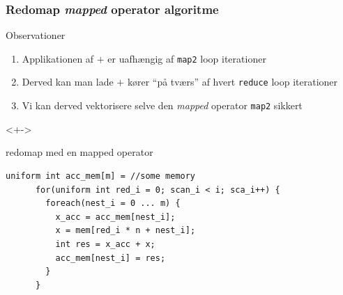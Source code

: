 \documentclass[t]{beamer}
\begin{document}
\begin{frame}[fragile]
  \frametitle{Redomap \textit{mapped} operator algoritme}
  Observationer
  \begin{enumerate}
    \item<+-> Applikationen af $+$ er uafhængig af \texttt{map2} loop iterationer
    \item<+-> Derved kan man lade $+$ kører ``på tværs'' af hvert \texttt{reduce} loop iterationer
    \item<+-> Vi kan derved vektorisere selve den \textit{mapped} operator \texttt{map2} sikkert
  \end{enumerate}
  \begin{onlyenv}<+->
    \begin{block}{redomap med en mapped operator}
\begin{lstlisting}[language=ispc]
      uniform int acc_mem[m] = //some memory
      for(uniform int red_i = 0; scan_i < i; sca_i++) {
        foreach(nest_i = 0 ... m) {
          x_acc = acc_mem[nest_i];
          x = mem[red_i * n + nest_i];
          int res = x_acc + x;
          acc_mem[nest_i] = res;
        }
      }
\end{lstlisting}
    \end{block}
  \end{onlyenv}
  \end{frame}
\end{document}
